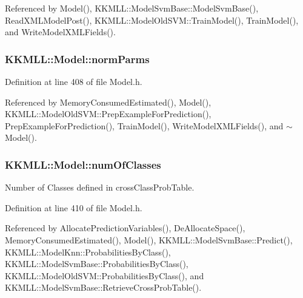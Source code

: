 Referenced by Model(), K\+K\+M\+L\+L\+::\+Model\+Svm\+Base\+::\+Model\+Svm\+Base(), Read\+X\+M\+L\+Model\+Post(), K\+K\+M\+L\+L\+::\+Model\+Old\+S\+V\+M\+::\+Train\+Model(), Train\+Model(), and Write\+Model\+X\+M\+L\+Fields().

\subsubsection[{\texorpdfstring{norm\+Parms}{normParms}}]{ K\+K\+M\+L\+L\+::\+Model\+::norm\+Parms\hspace{0.3cm}{\ttfamily [protected]}}\hypertarget{class_k_k_m_l_l_1_1_model_a48d8d3c4865176a24cee0b2b733da058}{}\label{class_k_k_m_l_l_1_1_model_a48d8d3c4865176a24cee0b2b733da058}


Definition at line 408 of file Model.\+h.



Referenced by Memory\+Consumed\+Estimated(), Model(), K\+K\+M\+L\+L\+::\+Model\+Old\+S\+V\+M\+::\+Prep\+Example\+For\+Prediction(), Prep\+Example\+For\+Prediction(), Train\+Model(), Write\+Model\+X\+M\+L\+Fields(), and $\sim$\+Model().

\subsubsection[{\texorpdfstring{num\+Of\+Classes}{numOfClasses}}]{ K\+K\+M\+L\+L\+::\+Model\+::num\+Of\+Classes\hspace{0.3cm}{\ttfamily [protected]}}\hypertarget{class_k_k_m_l_l_1_1_model_ad41340e916a5ccdae7ed38d9546a8445}{}\label{class_k_k_m_l_l_1_1_model_ad41340e916a5ccdae7ed38d9546a8445}
Number of Classes defined in cross\+Class\+Prob\+Table. 

Definition at line 410 of file Model.\+h.



Referenced by Allocate\+Prediction\+Variables(), De\+Allocate\+Space(), Memory\+Consumed\+Estimated(), Model(), K\+K\+M\+L\+L\+::\+Model\+Svm\+Base\+::\+Predict(), K\+K\+M\+L\+L\+::\+Model\+Knn\+::\+Probabilities\+By\+Class(), K\+K\+M\+L\+L\+::\+Model\+Svm\+Base\+::\+Probabilities\+By\+Class(), K\+K\+M\+L\+L\+::\+Model\+Old\+S\+V\+M\+::\+Probabilities\+By\+Class(), and K\+K\+M\+L\+L\+::\+Model\+Svm\+Base\+::\+Retrieve\+Cross\+Prob\+Table().

